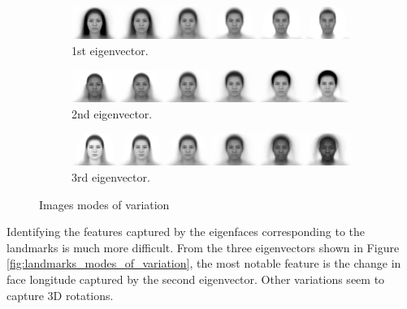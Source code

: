 \documentclass{article}
\begin{document}
\begin{figure}[H]
    \centering

    \begin{subfigure}[b]{0.8\textwidth}
        \centering
        \includegraphics[width=\linewidth]{images/mv_image_eigenvector_0.jpg}
        \caption{1st eigenvector.}
        \label{fig:preprocessed_landmarks}
    \end{subfigure}


    \begin{subfigure}[b]{0.8\textwidth}
        \centering
        \includegraphics[width=\linewidth]{images/mv_image_eigenvector_1.jpg}
        \caption{2nd eigenvector.}
        \label{fig:second_repetition}
    \end{subfigure}


    \begin{subfigure}[b]{0.8\textwidth}
        \centering
        \includegraphics[width=\linewidth]{images/mv_image_eigenvector_2.jpg}
        \caption{3rd eigenvector.}
        \label{fig:third_repetition}
    \end{subfigure}

    \caption{Images modes of variation}
    \label{fig:images_modes_of_variation}
\end{figure}

Identifying the features captured by the eigenfaces corresponding to the landmarks is much more difficult. From the three eigenvectors shown in Figure \ref{fig:landmarks_modes_of_variation}, the most notable feature is the change in face longitude captured by the second eigenvector. Other variations seem to capture 3D rotations.
\end{document}
